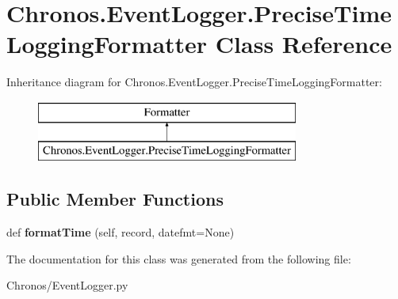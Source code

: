 \hypertarget{classChronos_1_1EventLogger_1_1PreciseTimeLoggingFormatter}{}\section{Chronos.\+Event\+Logger.\+Precise\+Time\+Logging\+Formatter Class Reference}
\label{classChronos_1_1EventLogger_1_1PreciseTimeLoggingFormatter}
Inheritance diagram for Chronos.\+Event\+Logger.\+Precise\+Time\+Logging\+Formatter\+:\begin{figure}[H]
\begin{center}
\leavevmode
\includegraphics[height=2.000000cm]{classChronos_1_1EventLogger_1_1PreciseTimeLoggingFormatter}
\end{center}
\end{figure}
\subsection*{Public Member Functions}
\begin{DoxyCompactItemize}
\item 
def {\bfseries format\+Time} (self, record, datefmt=None)
\end{DoxyCompactItemize}


The documentation for this class was generated from the following file\+:\begin{DoxyCompactItemize}
\item 
Chronos/Event\+Logger.\+py\end{DoxyCompactItemize}
